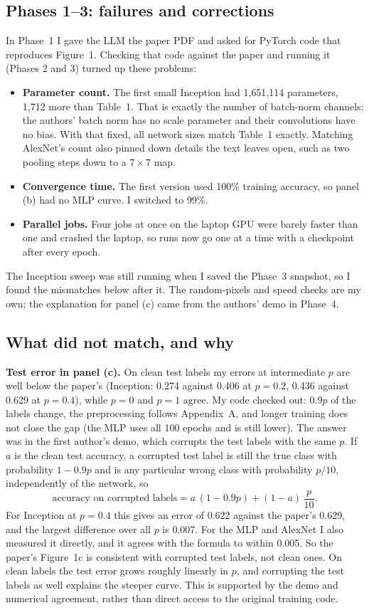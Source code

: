 \subsection{Phases 1--3: failures and corrections}
In Phase~1 I gave the LLM the paper PDF and asked for PyTorch code that reproduces Figure~1. Checking that code against the paper and running it (Phases 2 and 3) turned up these problems:
\begin{itemize}
  \item \textbf{Parameter count.} The first small Inception had 1{,}651{,}114 parameters, 1{,}712 more than Table~1. That is exactly the number of batch-norm channels: the authors' batch norm has no scale parameter and their convolutions have no bias. With that fixed, all network sizes match Table~1 exactly. Matching AlexNet's count also pinned down details the text leaves open, such as two pooling steps down to a $7\times7$ map.
  \item \textbf{Convergence time.} The first version used 100\% training accuracy, so panel (b) had no MLP curve. I switched to 99\%.
  \item \textbf{Parallel jobs.} Four jobs at once on the laptop GPU were barely faster than one and crashed the laptop, so runs now go one at a time with a checkpoint after every epoch.
\end{itemize}
The Inception sweep was still running when I saved the Phase~3 snapshot, so I found the mismatches below after it. The random-pixels and speed checks are my own; the explanation for panel (c) came from the authors' demo in Phase~4.

\subsection{What did not match, and why}\label{sec:mismatch}
\textbf{Test error in panel (c).} On clean test labels my errors at intermediate $p$ are well below the paper's (Inception: 0.274 against 0.406 at $p=0.2$, 0.436 against 0.629 at $p=0.4$), while $p=0$ and $p=1$ agree. My code checked out: $0.9p$ of the labels change, the preprocessing follows Appendix~A, and longer training does not close the gap (the MLP uses all 100 epochs and is still lower). The answer was in the first author's demo, which corrupts the test labels with the same $p$. If $a$ is the clean test accuracy, a corrupted test label is still the true class with probability $1-0.9p$ and is any particular wrong class with probability $p/10$, independently of the network, so
\[
  \text{accuracy on corrupted labels}=a\,(1-0.9p)+(1-a)\,\frac{p}{10}.
\]
For Inception at $p=0.4$ this gives an error of 0.622 against the paper's 0.629, and the largest difference over all $p$ is 0.007. For the MLP and AlexNet I also measured it directly, and it agrees with the formula to within 0.005. So the paper's Figure~1c is consistent with corrupted test labels, not clean ones. On clean labels the test error grows roughly linearly in $p$, and corrupting the test labels as well explains the steeper curve. This is supported by the demo and numerical agreement, rather than direct access to the original training code.

